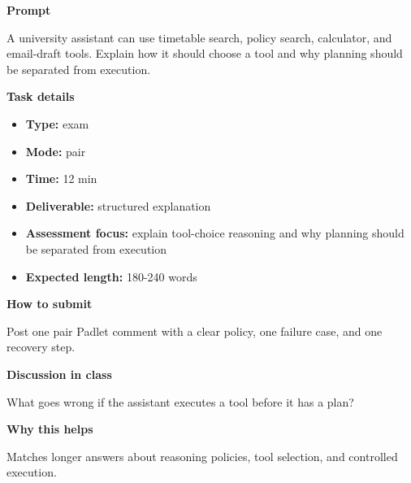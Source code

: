 \documentclass[11pt]{article}
\begin{document}
\begin{tcolorbox}[colback=white,colframe=MidnightBlue,title={Q6 Exam-Style Constructed Response},fonttitle=\bfseries,breakable]
\begin{center}
\end{center}

{\large\bfseries\color{MidnightBlue} Prompt}\par\medskip
A university assistant can use timetable search, policy search, calculator, and email-draft tools. Explain how it should choose a tool and why planning should be separated from execution.

{\large\bfseries\color{MidnightBlue} Task details}\par\medskip
\begin{itemize}\item \textbf{Type:} exam
\item \textbf{Mode:} pair
\item \textbf{Time:} 12 min
\item \textbf{Deliverable:} structured explanation
\item \textbf{Assessment focus:} explain tool-choice reasoning and why planning should be separated from execution
\item \textbf{Expected length:} 180-240 words\end{itemize}

{\large\bfseries\color{MidnightBlue} How to submit}\par\medskip
Post one pair Padlet comment with a clear policy, one failure case, and one recovery step.

{\large\bfseries\color{MidnightBlue} Discussion in class}\par\medskip
What goes wrong if the assistant executes a tool before it has a plan?

{\large\bfseries\color{MidnightBlue} Why this helps}\par\medskip
Matches longer answers about reasoning policies, tool selection, and controlled execution.


\end{tcolorbox}
\end{document}
